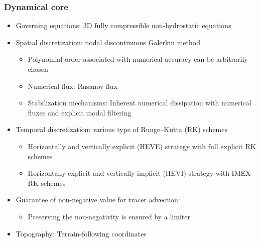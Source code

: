 \subsubsection{Dynamical core}
\begin{itemize}
 \item Governing equations: 3D fully compressible non-hydrostatic equations
 \item Spatial discretization: nodal discontinuous Galerkin method \citep{hesthaven2007nodal}
    \begin{itemize}
      \item Polynomial order associated with numerical accuracy can be arbitrarily chosen
      \item Numerical flux: Rusanov flux \citep{Rusanov1961}
      \item Stabilization mechanisms: Inherent numerical dissipation with numerical fluxes and explicit modal filtering
    \end{itemize}
 \item Temporal discretization: various type of Runge--Kutta (RK) schemes
    \begin{itemize}
      \item Horizontally and vertically explicit (HEVE) strategy with full explicit RK schemes
      \item Horizontally explicit and vertically implicit (HEVI) strategy with IMEX RK schemes
    \end{itemize}
 \item Guarantee of non-negative value for tracer advection:
    \begin{itemize}
      \item Preserving the non-negativity is ensured by a limiter \citep{LightPreserving2016}
    \end{itemize}
 \item Topography: Terrain-following coordinates
\end{itemize}


